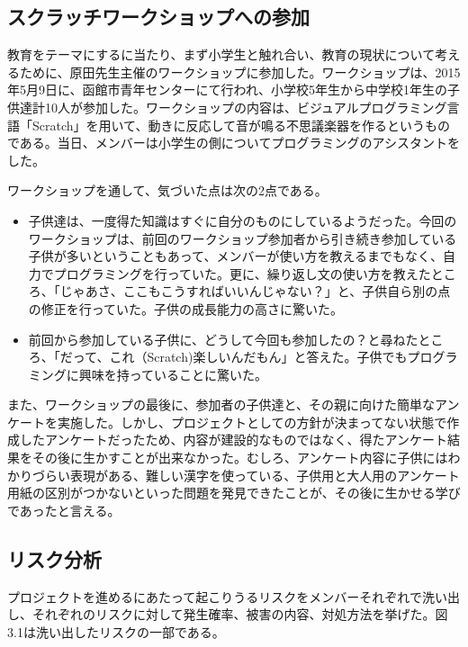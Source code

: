 \documentclass[openany,11pt,papersize]{jsbook}
\begin{document}
\subsection{スクラッチワークショップへの参加}
\par 教育をテーマにするに当たり、まず小学生と触れ合い、教育の現状について考えるために、原田先生主催のワークショップに参加した。ワークショップは、2015年5月9日に、函館市青年センターにて行われ、小学校5年生から中学校1年生の子供達計10人が参加した。ワークショップの内容は、ビジュアルプログラミング言語「Scratch」を用いて、動きに反応して音が鳴る不思議楽器を作るというものである。当日、メンバーは小学生の側についてプログラミングのアシスタントをした。
\par ワークショップを通して、気づいた点は次の2点である。
\begin{itemize}
\item 子供達は、一度得た知識はすぐに自分のものにしているようだった。今回のワークショップは、前回のワークショップ参加者から引き続き参加している子供が多いということもあって、メンバーが使い方を教えるまでもなく、自力でプログラミングを行っていた。更に、繰り返し文の使い方を教えたところ、「じゃあさ、ここもこうすればいいんじゃない？」と、子供自ら別の点の修正を行っていた。子供の成長能力の高さに驚いた。
\item 前回から参加している子供に、どうして今回も参加したの？と尋ねたところ、「だって、これ（Scratch)楽しいんだもん」と答えた。子供でもプログラミングに興味を持っていることに驚いた。
\end{itemize}

\par また、ワークショップの最後に、参加者の子供達と、その親に向けた簡単なアンケートを実施した。しかし、プロジェクトとしての方針が決まってない状態で作成したアンケートだったため、内容が建設的なものではなく、得たアンケート結果をその後に生かすことが出来なかった。むしろ、アンケート内容に子供にはわかりづらい表現がある、難しい漢字を使っている、子供用と大人用のアンケート用紙の区別がつかないといった問題を発見できたことが、その後に生かせる学びであったと言える。


\subsection{リスク分析}
\par プロジェクトを進めるにあたって起こりうるリスクをメンバーそれぞれで洗い出し、それぞれのリスクに対して発生確率、被害の内容、対処方法を挙げた。図3.1は洗い出したリスクの一部である。
\end{document}
